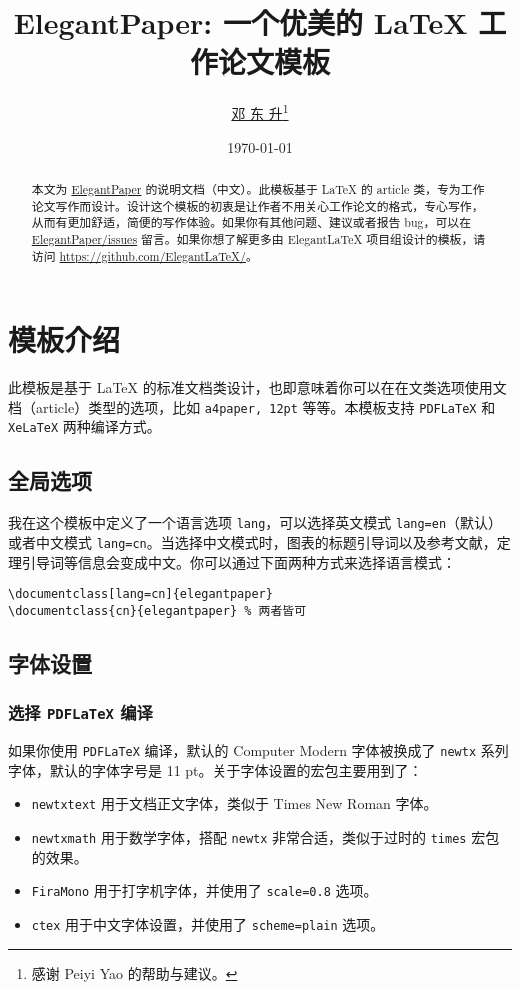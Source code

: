 \documentclass[lang=cn]{elegantpaper}
\title{ElegantPaper: 一个优美的 \LaTeX{} 工作论文模板}
\author{\href{https://ddswhu.me/}{邓 东 升}\thanks{感谢 Peiyi Yao 的帮助与建议。}}
\institute{\href{https://elegantlatex.org/}{Elegant\LaTeX{} 项目组}}
\date{\today}
\begin{document}
\maketitle

\begin{abstract}
\noindent 本文为 \href{https://github.com/ElegantLaTeX/ElegantPaper/}{ElegantPaper} 的说明文档（中文）。此模板基于 \LaTeX{} 的 article 类，专为工作论文写作而设计。设计这个模板的初衷是让作者不用关心工作论文的格式，专心写作，从而有更加舒适，简便的写作体验。如果你有其他问题、建议或者报告 bug，可以在 \href{https://github.com/ElegantLaTeX/ElegantPaper/issues}{ElegantPaper/issues} 留言。如果你想了解更多由 Elegant\LaTeX{} 项目组设计的模板，请访问 \href{https://github.com/ElegantLaTeX/}{https://github.com/ElegantLaTeX/}。
\end{abstract}

\section{模板介绍}

此模板是基于 \LaTeX{} 的标准文档类设计，也即意味着你可以在在文类选项使用文档（article）类型的选项，比如 \lstinline{a4paper, 12pt} 等等。本模板支持 \lstinline{PDFLaTeX} 和 \lstinline{XeLaTeX} 两种编译方式。
      
\subsection{全局选项}
我在这个模板中定义了一个语言选项 \lstinline{lang}，可以选择英文模式 \lstinline{lang=en}（默认）或者中文模式 \lstinline{lang=cn}。当选择中文模式时，图表的标题引导词以及参考文献，定理引导词等信息会变成中文。你可以通过下面两种方式来选择语言模式：
\begin{lstlisting}
\documentclass[lang=cn]{elegantpaper}
\documentclass{cn}{elegantpaper} % 两者皆可
\end{lstlisting}

\subsection{字体设置}
\subsubsection[选择 PDFLaTeX 编译]{选择 \lstinline{PDFLaTeX} 编译}
如果你使用 \lstinline{PDFLaTeX} 编译，默认的 Computer Modern 字体被换成了 \lstinline{newtx} 系列字体，默认的字体字号是 11 pt。关于字体设置的宏包主要用到了：
\begin{itemize}
	\item \lstinline{newtxtext} 用于文档正文字体，类似于 Times New Roman 字体。
	\item \lstinline{newtxmath} 用于数学字体，搭配 \lstinline{newtx} 非常合适，类似于过时的 \lstinline{times} 宏包的效果。
	\item \lstinline{FiraMono} 用于打字机字体，并使用了 \lstinline{scale=0.8} 选项。
	\item \lstinline{ctex} 用于中文字体设置，并使用了 \lstinline{scheme=plain} 选项。
\end{itemize}
\end{document}
